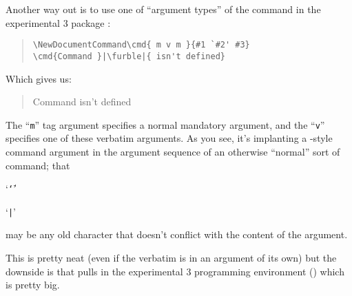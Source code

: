 Another way out is to use one of ``argument types'' of the
 command in the experimental \latex{}3 package
:
\begin{quote}
\begin{verbatim}
\NewDocumentCommand\cmd{ m v m }{#1 `#2' #3}
\cmd{Command }|\furble|{ isn't defined}
\end{verbatim}
\end{quote}
Which gives us:
\begin{quote}
  Command  isn't defined
\end{quote}
The ``\texttt{m}'' tag argument specifies a normal mandatory argument,
and the ``\texttt{v}'' specifies one of these verbatim arguments.
As you see, it's implanting a -style command argument in the
argument sequence of an otherwise ``normal'' sort of command; that
\begin{typesetversion}
  `\texttt{\char`\|}'
\end{typesetversion}
\begin{htmlversion}
  `\texttt{|}' %
\end{htmlversion}
may be any old character that doesn't
conflict with the content of the argument.

This is pretty neat (even if the verbatim is in an argument of its
own) but the downside is that  pulls in
the experimental \latex{}3 programming environment
() which is pretty big.

